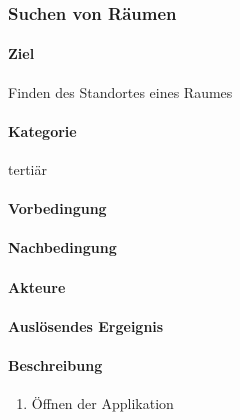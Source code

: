 \subsubsection{Suchen von Räumen}
\paragraph{Ziel}
Finden des Standortes eines Raumes
\paragraph{Kategorie}
tertiär
\paragraph{Vorbedingung}

\paragraph{Nachbedingung}

\paragraph{Akteure}

\paragraph{Auslösendes Ergeignis}

\paragraph{Beschreibung}
\begin{enumerate}
    \item Öffnen der Applikation
\end{enumerate}